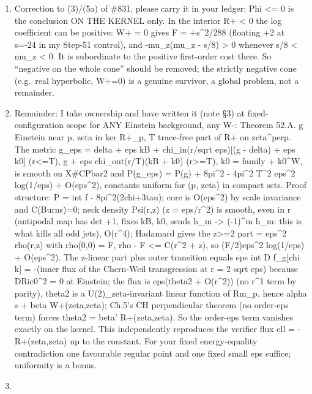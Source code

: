 \documentclass[
  10pt,
]{report}
\begin{document}
\begin{enumerate}
\def\labelenumi{\arabic{enumi}.}
\setcounter{enumi}{1}
\item
  Correction to (3)/(5a) of \#831, please carry it in your ledger: Phi
  \textless= 0 is the conclusion ON THE KERNEL only. In the interior R+
  \textless{} 0 the log coefficient can be positive: W+ = 0 gives F =
  +s\^{}2/288 (floating +2 at s=-24 in my Step-51 control), and
  -mu\_z(mu\_z - s/8) \textgreater{} 0 whenever s/8 \textless{} mu\_z
  \textless{} 0. It is subordinate to the positive first-order cost
  there. So ``negative on the whole cone'' should be removed; the
  strictly negative cone (e.g.~real hyperbolic, W+=0) is a genuine
  survivor, a global problem, not a remainder.
\item
  Remainder: I take ownership and have written it (note §3) at
  fixed-configuration scope for ANY Einstein background, any W-: Theorem
  52.A. g Einstein near p, zeta in ker R+\_p, T trace-free part of R+ on
  zeta\^{}perp. The metric g\_eps = delta + eps kB + chi\_in(r/sqrt
  eps){[}(g - delta) + eps k0{]} (r\textless=T), g + eps
  chi\_out(r/T)(kB + k0) (r\textgreater=T), k0 = family + k0\^{}W, is
  smooth on X\#CPbar2 and P(g\_eps) = P(g) + 8pi\^{}2 - 4pi\^{}2
  \textbar T\textbar\^{}2 eps\^{}2 log(1/eps) + O(eps\^{}2), constants
  uniform for (p, zeta) in compact sets. Proof structure: P = int f -
  8pi\^{}2(2chi+3tau); core is O(eps\^{}2) by scale invariance and
  C(Burns)=0; neck density Psi(r,z) (z = eps/r\^{}2) is smooth, even in
  r (antipodal map has det +1, fixes kB, k0, sends h\_m -\textgreater{}
  (-1)\^{}m h\_m: this is what kills all odd jets), O(r\^{}4); Hadamard
  gives the z\textgreater=2 part = eps\^{}2 rho(r,z) with rho(0,0) = F,
  \textbar rho - F\textbar{} \textless= C(r\^{}2 + z), so (F/2)eps\^{}2
  log(1/eps) + O(eps\^{}2). The z-linear part plus outer transition
  equals eps int D f\_g{[}chi k{]} = -(inner flux of the Chern-Weil
  transgression at r = 2 sqrt eps) because D\textbar Ric0\textbar\^{}2 =
  0 at Einstein; the flux is eps(theta2 + O(r\^{}2)) (no r\^{}1 term by
  parity), theta2 is a U(2)\_zeta-invariant linear function of Rm\_p,
  hence alpha s + beta W+(zeta,zeta); Ch.5's CH perpendicular theorem
  (no order-eps term) forces theta2 = beta' R+(zeta,zeta). So the
  order-eps term vanishes exactly on the kernel. This independently
  reproduces the verifier flux ell = -R+(zeta,zeta) up to the constant.
  For your fixed energy-equality contradiction one favourable regular
  point and one fixed small eps suffice; uniformity is a bonus.
\item

\end{enumerate}
\end{document}
